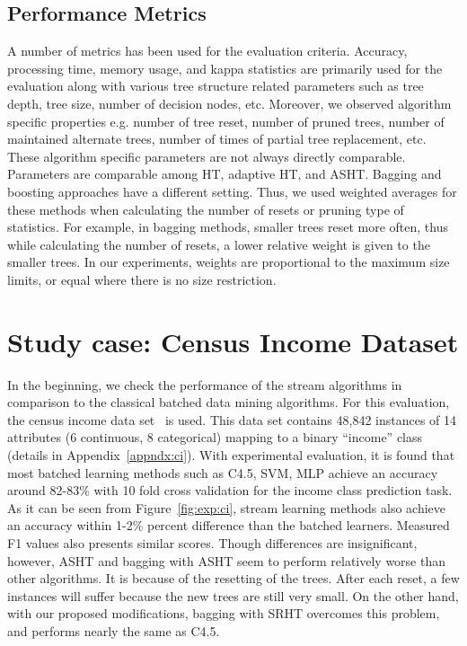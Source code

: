 \subsection{Performance Metrics}
A number of metrics has been used for the evaluation criteria. Accuracy, processing time, memory usage, and kappa statistics are primarily used for the evaluation along with various tree structure related parameters such as tree depth, tree size, number of decision nodes, etc. Moreover, we observed algorithm specific properties e.g. number of tree reset, number of pruned trees, number of maintained alternate trees, number of times of partial tree replacement, etc. These algorithm specific parameters are not always directly comparable. Parameters are comparable among HT, adaptive HT, and ASHT. Bagging and boosting approaches have a different setting. Thus, we used weighted averages for these methods when calculating the number of resets or pruning type of statistics. For example, in bagging methods, smaller trees reset more often, thus while calculating the number of resets, a lower relative weight is given to the smaller trees. In our experiments, weights are proportional to the maximum size limits, or equal where there is no size restriction.


\section{Study case: Census Income Dataset}
In the beginning, we check the performance of the stream algorithms in comparison to the classical batched data mining algorithms. For this evaluation, the census income data set~\cite{ron:adultds} is  used. This data set contains 48,842 instances of 14 attributes (6 continuous, 8 categorical) mapping to a binary ``income'' class (details in Appendix~\ref{appndx:ci}). With experimental evaluation, it is found that most batched learning methods such as C4.5, SVM, MLP achieve an accuracy around 82-83\% with 10 fold cross validation for the income class prediction task. As it can be seen from Figure~\ref{fig:exp:ci}, stream learning methods also achieve an accuracy within 1-2\% percent difference than the batched learners. Measured F1 values also presents similar scores. Though differences are insignificant, however, ASHT and bagging with ASHT seem to perform relatively worse than other algorithms. It is because of the resetting of the trees. After each reset, a few instances will suffer because the new trees are still very small. On the other hand, with our proposed modifications, bagging with SRHT overcomes this problem, and performs nearly the same as C4.5.

